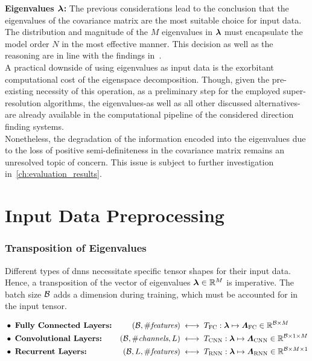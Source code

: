 \textbf{Eigenvalues \( \boldsymbol{\lambda} \):}
The previous considerations lead to the conclusion that the eigenvalues of the covariance matrix are the most suitable
choice for input data. The distribution and magnitude of the \( M \) eigenvalues in \( \boldsymbol{\lambda} \) must encapsulate the model
order \( N \) in the most effective manner. This decision as well as the reasoning are in line with the findings in~\cite{yang2020}.\\
A practical downside of using eigenvalues as input data is the exorbitant computational cost of the eigenspace decomposition.
Though, given the pre-existing necessity of this operation, as a preliminary step for the employed super-resolution algorithms, the
eigenvalues-as well as all other discussed alternatives-are already available in the computational pipeline of the considered
direction finding systems.\\
Nonetheless, the degradation of the information encoded into the eigenvalues due to the loss of positive semi-definiteness
in the covariance matrix remains an unresolved topic of concern. This issue is subject to further investigation
in~\autoref{ch:evaluation_results}.


\section{Input Data Preprocessing}
\label{sec:input_data_preprocessing}

\subsubsection{Transposition of Eigenvalues}
Different types of \glspl{dnn} necessitate specific tensor shapes for their input data. Hence, a transposition of the vector of
eigenvalues \( \boldsymbol{\lambda} \in \mathbb{R}^M \) is imperative. The batch size \( \mathcal{B} \) adds a dimension during training, which
must be accounted for in the input tensor.

\begin{align}
    &\bullet \; \textbf{Fully Connected Layers:} & (\mathcal{B}, \#\textit{features}) \;& \longleftrightarrow \; T_{\mathrm{FC}} : \boldsymbol{\lambda} \mapsto \boldsymbol{\varLambda}_{\mathrm{FC}} \in \mathbb{R}^{\mathcal{B} \times M} \label{eq:transposition_mlp}\\
    &\bullet \; \textbf{Convolutional Layers:} & (\mathcal{B}, \#\textit{channels}, L) \;& \longleftrightarrow \; T_{\mathrm{CNN}} : \boldsymbol{\lambda} \mapsto \boldsymbol{\varLambda}_{\mathrm{CNN}} \in \mathbb{R}^{\mathcal{B} \times 1 \times M} \label{eq:transposition_cnn}\\
    &\bullet \; \textbf{Recurrent Layers:} & (\mathcal{B}, L, \#\textit{features}) \;& \longleftrightarrow \; T_{\mathrm{RNN}} : \boldsymbol{\lambda} \mapsto \boldsymbol{\varLambda}_{\mathrm{RNN}} \in \mathbb{R}^{\mathcal{B} \times M \times 1} \label{eq:transposition_rnn}
\end{align}

